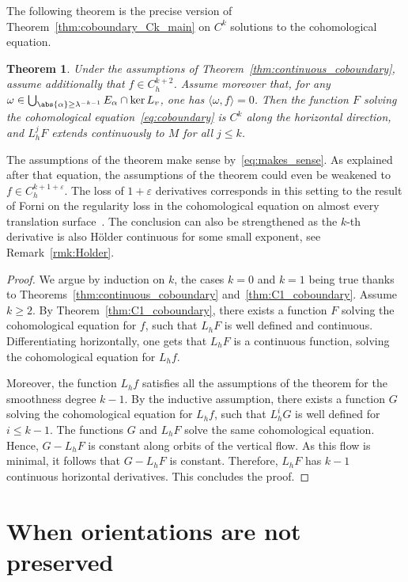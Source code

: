 \documentclass[10pt]{amsart}
\let\epsilon\varepsilon
\newtheorem{thm}{Theorem}[section]
\theoremstyle{definition}
\numberwithin{equation}{section}
\begin{document}
The following theorem is the precise version of
Theorem~\ref{thm:coboundary_Ck_main} on $C^k$ solutions to the cohomological
equation.
\begin{thm}
\label{thm:coboundary_Ck} Under the assumptions of
Theorem~\ref{thm:continuous_coboundary}, assume additionally that $f \in
C^{k+2}_h$. Assume moreover that, for any $\omega \in \bigcup_{\abs{\alpha}
\geq \lambda^{-k-1}} E_\alpha \cap \ker L_v$, one has $\langle \omega, f
\rangle = 0$. Then the function $F$ solving the cohomological
equation~\eqref{eq:coboundary} is $C^k$ along the horizontal direction, and
$L^j_h F$ extends continuously to $M$ for all $j\leq k$.
\end{thm}
The assumptions of the theorem make sense by~\eqref{eq:makes_sense}. As
explained after that equation, the assumptions of the theorem could even be
weakened to $f \in C^{k+1+\epsilon}_h$. The loss of $1+\epsilon$ derivatives
corresponds in this setting to the result of Forni on the regularity loss in
the cohomological equation on almost every translation
surface~\cite{forni_regularity}. The conclusion can also be strengthened as
the $k$-th derivative is also Hölder continuous for some small exponent, see
Remark~\ref{rmk:Holder}.
\begin{proof}
We argue by induction on $k$, the cases $k=0$ and $k=1$ being true thanks to
Theorems~\ref{thm:continuous_coboundary} and~\ref{thm:C1_coboundary}. Assume
$k\geq 2$. By Theorem~\ref{thm:C1_coboundary}, there exists a function $F$
solving the cohomological equation for $f$, such that $L_h F$ is well defined
and continuous. Differentiating horizontally, one gets that $L_h F$ is a
continuous function, solving the cohomological equation for $L_h f$.

Moreover, the function $L_h f$ satisfies all the assumptions of the theorem
for the smoothness degree $k-1$. By the inductive assumption, there exists a
function $G$ solving the cohomological equation for $L_h f$, such that $L_h^i
G$ is well defined for $i \leq k-1$. The functions $G$ and $L_h F$ solve the
same cohomological equation. Hence, $G-L_h F$ is constant along orbits of the
vertical flow. As this flow is minimal, it follows that $G-L_h F$ is
constant. Therefore, $L_h F$ has $k-1$ continuous horizontal derivatives.
This concludes the proof.
\end{proof}

\section{When orientations are not preserved}
\label{sec:orientations}
\end{document}

